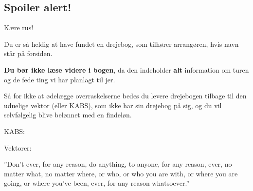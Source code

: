 \documentclass[../../main.tex]{subfiles}
\begin{document}
\begin{center}
\section*{{\color{red} {\Huge Spoiler alert!}}}
\end{center}
{ \large
Kære rus!

Du er så heldig at have fundet en drejebog, som tilhører arrangøren, hvis navn står på forsiden.

\textbf{Du bør ikke læse videre i bogen}, da den indeholder \textbf{alt} information om turen og de fede ting vi har planlagt til jer. 

Så for ikke at ødelægge overraskelserne bedes du levere drejebogen tilbage til den uduelige vektor (eller KABS), som ikke har sin drejebog på sig, og du vil selvfølgelig blive belønnet med en findeløn.
}
\begin{center}

{\huge KABS:


\KABS

\KABSEKS
}

\vspace*{3em}

{\huge Vektorer: 


\VEKTOREKS
}

\end{center}
\vfill
\begin{center}
    {\large ''Don't ever, for any reason, do anything, to anyone, for any reason, ever, no matter what, no matter where, or who, or who you are with, or where you are going, or where you've been, ever, for any reason whatsoever.''}
\end{center}
\newpage
\end{document}

